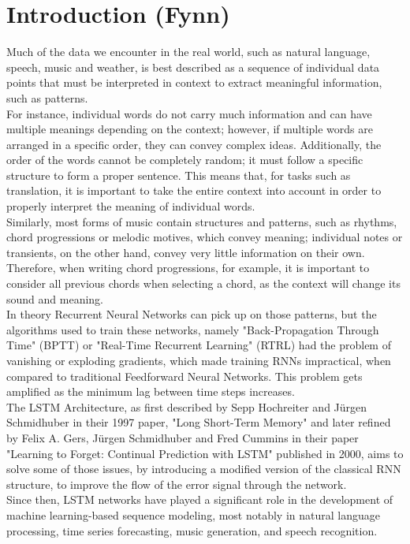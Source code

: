 \documentclass[twoside,a4paper,10pt,DIV=12,BCOR=12mm]{scrartcl}
\begin{document}
\section{Introduction (Fynn)}
Much of the data we encounter in the real world, such as natural language, speech, music and weather, is best described as a sequence of individual data points that must be interpreted in context to extract meaningful information, such as patterns.\\
For instance, individual words do not carry much information and can have multiple meanings depending on the context; however, if multiple words are arranged in a specific order, they can convey complex ideas. Additionally, the order of the words cannot be completely random; it must follow a specific structure to form a proper sentence. This means that, for tasks such as translation, it is important to take the entire context into account in order to properly interpret the meaning of individual words.\cite{harris1954languagestructure}\\
Similarly, most forms of music contain structures and patterns, such as rhythms, chord progressions or melodic motives, which convey meaning; individual notes or transients, on the other hand, convey very little information on their own. Therefore, when writing chord progressions, for example, it is important to consider all previous chords when selecting a chord, as the context will change its sound and meaning.\cite{eck2002musicgeneration}\\
In theory Recurrent Neural Networks can pick up on those patterns, but the algorithms used to train these networks, namely "Back-Propagation Through Time" (BPTT) or "Real-Time Recurrent Learning" (RTRL) had the problem of vanishing or exploding gradients, which made training RNNs impractical, when compared to traditional Feedforward Neural Networks. This problem gets amplified as the minimum lag between time steps increases.\cite{hochreiter1997lstm,werb1990bptt}\\
The LSTM Architecture, as first described by Sepp Hochreiter and Jürgen Schmidhuber in their 1997 paper, "Long Short-Term Memory" and later refined by Felix A. Gers, Jürgen Schmidhuber and Fred Cummins in their paper "Learning to Forget: Continual Prediction with LSTM" published in 2000, aims to solve some of those issues, by introducing a modified version of the classical RNN structure, to improve the flow of the error signal through the network.\cite{hochreiter1997lstm}\\
Since then, LSTM networks have played a significant role in the development of machine learning-based sequence modeling, most notably in natural language processing, time series forecasting, music generation, and speech recognition.\cite{eck2002musicgeneration,torres2022elctricityforecasting,gers2001timeseries,nielsen2024electricitypriceforcasting, gers2000lstmnlp}\\
\end{document}
